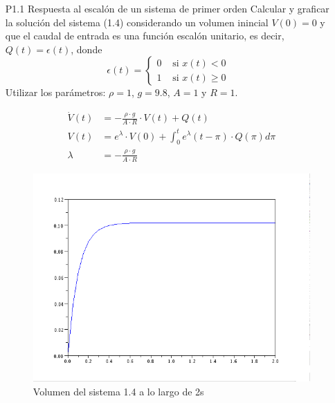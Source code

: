 \documentclass{article}
\begin{document}
\begin{itemize}

  \item[P1.1] Respuesta al escalón de un sistema de primer orden
Calcular y graficar la solución del sistema (1.4) considerando un volumen inincial $ V(0)=0 $ y que el caudal de entrada es una función escalón unitario, es decir, $Q(t)=\epsilon(t)$, donde 
\begin{equation}
\epsilon(t) = \left\{ \begin{array}{rl}
  0 &\mbox{ si $x(t) < 0$} \\
  1 &\mbox{ si $x(t) \geq 0$ }
       \end{array} \right .
 \label{P1.1a} \tag{P1.1a}
\end{equation}
Utilizar los parámetros: $\rho = 1$, $g=9.8$, $A= 1$ y $R = 1$.

\begin{align*}
  \dot{V}(t) &= -\frac{\rho \cdot g}{A \cdot R} \cdot V(t) + Q(t) \\
  V(t) &= e^{\lambda} \cdot V(0) + \int_0^t e^{\lambda} (t - \pi) \cdot Q(\pi) d\pi \\
  \lambda &= -\frac{\rho \cdot g}{A \cdot R}
\end{align*}

\begin{figure}%
\includegraphics[width=\textwidth]{img/ej01.png}
\caption{Volumen del sistema 1.4 a lo largo de 2s}
\label{fig:p1.1}
\end{figure}


\end{itemize}
\end{document}
